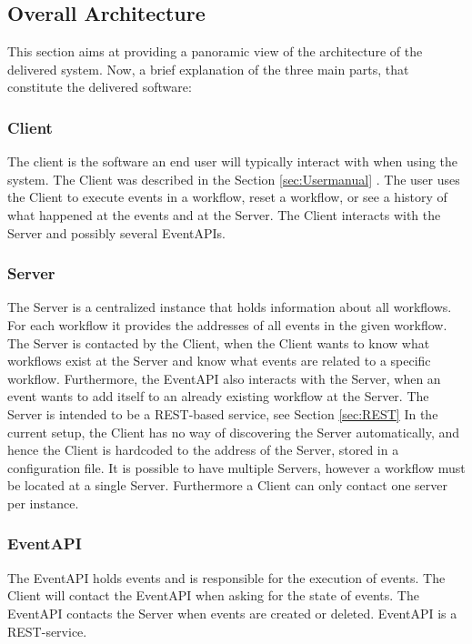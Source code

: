 \subsection{Overall Architecture}
This section aims at providing a panoramic view of the architecture of the delivered system. \newline
Now, a brief explanation of the three main parts, that constitute the delivered software:
\subsubsection{Client}
The client is the software an end user will typically interact with when using the system. The Client was described in the Section  \ref{sec:Usermanual} . The user uses the Client to execute events in a workflow, reset a workflow, or see a history of what happened at the events and at the Server. The Client interacts with the Server and possibly several EventAPIs.
\subsubsection{Server}
The Server is a centralized instance that holds information about all workflows. For each workflow it provides the addresses of all events in the given workflow. The Server is contacted by the Client, when the Client wants to know what workflows exist at the Server and know what events are related to a specific workflow. \newline
Furthermore, the EventAPI also interacts with the Server, when an event wants to add itself to an already existing workflow at the Server. The Server is intended to be a REST-based service, see Section  \ref{sec:REST}  \newline
In the current setup, the Client has no way of discovering the Server automatically, and hence the Client is hardcoded to the address of the Server, stored in a configuration file. It is possible to have multiple Servers, however a workflow must be located at a single Server. Furthermore a Client can only contact one server per instance.

\subsubsection{EventAPI}
The EventAPI holds events and is responsible for the execution of events. The Client will contact the EventAPI when asking for the state of events. The EventAPI contacts the Server when events are created or deleted. EventAPI is a REST-service. \\

